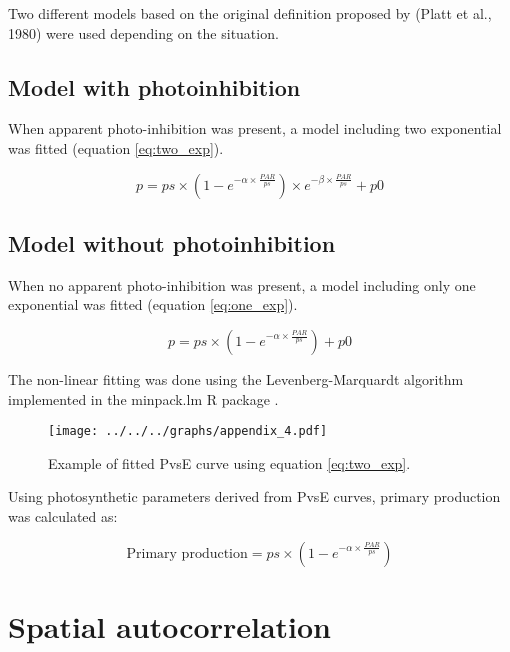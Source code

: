 \documentclass[12pt,a4paper]{scrartcl}
\begin{document}
Two different models based on the original definition proposed by (Platt et al., 1980) were used depending on the situation.

\subsection*{Model with photoinhibition}

When apparent photo-inhibition was present, a model including two exponential was fitted (equation \ref{eq:two_exp}).

\begin{equation}
	p = ps \times (1 - e^{-\alpha \times \frac{PAR}{ps}}) \times e^{-\beta \times \frac{PAR}{ps}} + p0
	\label{eq:two_exp}
\end{equation}

\subsection*{Model without photoinhibition}

When no apparent photo-inhibition was present, a model including only one exponential was fitted (equation \ref{eq:one_exp}).

\begin{equation}
	p = ps \times (1 - e^{-\alpha \times \frac{PAR}{ps}}) + p0
	\label{eq:one_exp}
\end{equation}

The non-linear fitting was done using the Levenberg-Marquardt algorithm implemented in the minpack.lm R package \citep{Elzhov2013}.

\begin{figure}[h]
	\centering
	\texttt{[image: ../../../graphs/appendix\_4.pdf]}
	\caption{Example of fitted PvsE curve using equation \ref{eq:two_exp}.}
\end{figure}

Using photosynthetic parameters derived from PvsE curves, primary production was calculated as:

\begin{equation}
	\text{Primary production} = ps \times (1 - e^{-\alpha \times \frac{PAR}{ps}})
	\label{eq:pp}
\end{equation}

%

\clearpage
\section*{Spatial autocorrelation}
\end{document}

